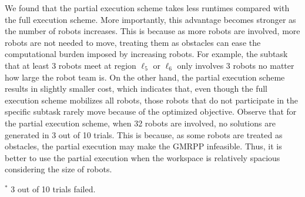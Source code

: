 \documentclass[Afour,sageh,times]{sagej}
\begin{document}
{{We found that the partial execution scheme takes less runtimes  compared with the full execution scheme. More importantly, this advantage becomes stronger as the number of robots increases. This is because as more robots are involved, more robots are not needed to move, treating them as obstacles can ease the computational burden imposed by increasing robots. For example, the subtask that at least 3 robots meet at region $\ell_5$ or $\ell_6$ only involves 3 robots no matter how large the robot team is. On the other hand, the partial execution scheme results in slightly smaller cost, which indicates that, even though the full execution scheme mobilizes all robots, those robots that do not participate in the specific subtask rarely move because of the optimized objective. Observe that for the partial execution scheme,  when 32 robots are involved, no solutions are generated in 3 out of 10 trials. This is because, as some robots are treated as obstacles,  the partial execution may make the GMRPP infeasible. Thus, it is better to use the partial execution when the workspace is relatively spacious considering the size of robots.


\begin{table}[!t]
  \caption{Results with respect to the number of robots.}\label{tab:scalability2}
  \centering
  \begin{tablenotes}
    \small
  \item $^*$ 3 out of 10 trials failed.
  \end{tablenotes}
\end{table}

}}
\end{document}
